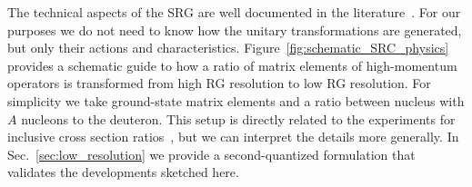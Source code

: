 \documentclass[10pt,aps,prc,floatfix,twocolumn,nofootinbib]{revtex4-1}
\begin{document}
The technical aspects of the SRG are well documented in the literature~\cite{Bogner:2009bt,Furnstahl:2013oba,Roth:2013fqa,Binder:2013xaa,Hergert:2016iju}.
For our purposes we do not need to know how the unitary transformations are generated, but only their actions and characteristics.
Figure~\ref{fig:schematic_SRC_physics} provides a schematic guide to how a ratio of matrix elements of high-momentum operators is transformed from high RG resolution to low RG resolution.
For simplicity we take ground-state matrix elements and a ratio between nucleus with $A$ nucleons to the deuteron.
This setup is directly related to the experiments for inclusive cross section ratios~\cite{Egiyan:2003vg,Egiyan:2005hs,Fomin:2011ng,Ye:2017mvo,Nguyen:2020mgo}, but we can interpret the details more generally.
In Sec.~\ref{sec:low_resolution} we provide a second-quantized formulation that validates the developments sketched here.
\end{document}
